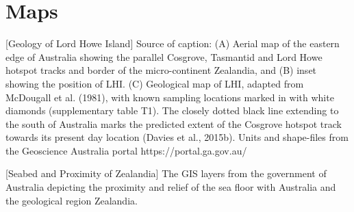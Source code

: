\documentclass[11pt]{article}
\begin{document}
\appendix
\section{Maps}
\noindent%
\begin{minipage}{\linewidth}%
\captionsetup{width=0.8\linewidth}
[Geology of Lord Howe Island]{
Source of caption\cite{lhi}:
(A) Aerial map of the eastern edge of Australia showing the parallel Cosgrove, Tasmantid and Lord Howe hotspot tracks and border of the micro-continent
Zealandia, and (B) inset showing the position of LHI. (C) Geological map of LHI, adapted from McDougall et al. (1981), with known sampling locations marked in
with white diamonds (supplementary table T1). The closely dotted black line extending to the south of Australia marks the predicted extent of the Cosgrove hotspot
track towards its present day location (Davies et al., 2015b). Units and shape-files from the Geoscience Australia portal https://portal.ga.gov.au/}
\label{geol1}
\end{minipage}
\vskip5mm

\noindent%
\begin{minipage}{\linewidth}%
\captionsetup{width=0.8\linewidth}
[Seabed and Proximity of Zealandia]{
The GIS layers from the government of Australia depicting the proximity
and relief of the sea floor with Australia and the geological 
region Zealandia.}
\label{geol2}
\end{minipage}
\vskip5mm
\end{document}
